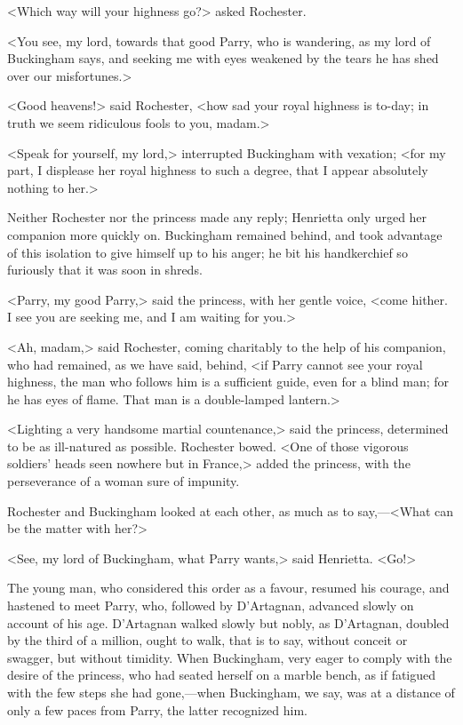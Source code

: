 <Which way will your highness go?> asked Rochester.

<You see, my lord, towards that good Parry, who is wandering, as my lord of Buckingham says, and seeking me with eyes weakened by the tears he has shed over our misfortunes.>

<Good heavens!> said Rochester, <how sad your royal highness is to-day; in truth we seem ridiculous fools to you, madam.>

<Speak for yourself, my lord,> interrupted Buckingham with vexation; <for my part, I displease her royal highness to such a degree, that I appear absolutely nothing to her.>

Neither Rochester nor the princess made any reply; Henrietta only urged her companion more quickly on. Buckingham remained behind, and took advantage of this isolation to give himself up to his anger; he bit his handkerchief so furiously that it was soon in shreds.

<Parry, my good Parry,> said the princess, with her gentle voice, <come hither. I see you are seeking me, and I am waiting for you.>

<Ah, madam,> said Rochester, coming charitably to the help of his companion, who had remained, as we have said, behind, <if Parry cannot see your royal highness, the man who follows him is a sufficient guide, even for a blind man; for he has eyes of flame. That man is a double-lamped lantern.>

<Lighting a very handsome martial countenance,> said the princess, determined to be as ill-natured as possible. Rochester bowed. <One of those vigorous soldiers' heads seen nowhere but in France,> added the princess, with the perseverance of a woman sure of impunity.

Rochester and Buckingham looked at each other, as much as to say,—<What can be the matter with her?>

<See, my lord of Buckingham, what Parry wants,> said Henrietta. <Go!>

The young man, who considered this order as a favour, resumed his courage, and hastened to meet Parry, who, followed by D'Artagnan, advanced slowly on account of his age. D'Artagnan walked slowly but nobly, as D'Artagnan, doubled by the third of a million, ought to walk, that is to say, without conceit or swagger, but without timidity. When Buckingham, very eager to comply with the desire of the princess, who had seated herself on a marble bench, as if fatigued with the few steps she had gone,—when Buckingham, we say, was at a distance of only a few paces from Parry, the latter recognized him.

